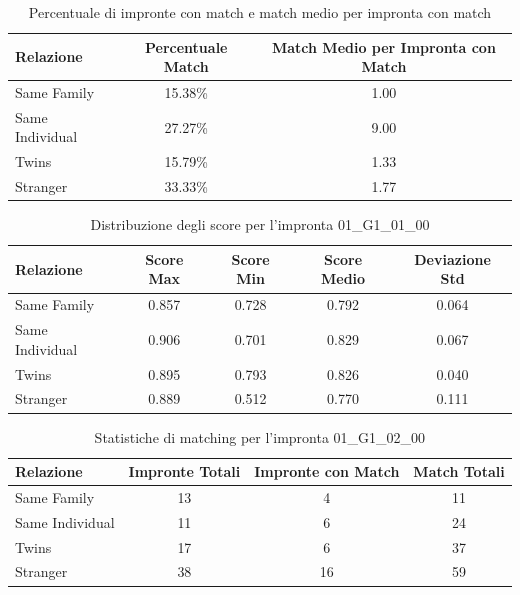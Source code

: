 \begin{table}[htbp]
\centering
\caption{Percentuale di impronte con match e match medio per impronta con match}
\label{tab:match_percentage_01_G1_01_00}
\begin{tabular}{|l|c|c|}
\hline
\textbf{Relazione} & \textbf{Percentuale Match} & \textbf{Match Medio per Impronta con Match} \\
\hline
Same Family & 15.38\% & 1.00 \\
\hline
Same Individual & 27.27\% & 9.00 \\
\hline
Twins & 15.79\% & 1.33 \\
\hline
Stranger & 33.33\% & 1.77 \\
\hline
\end{tabular}
\end{table}


\begin{table}[htbp]
\centering
\caption{Distribuzione degli score per l'impronta 01\_G1\_01\_00}
\label{tab:scores_01_G1_01_00}
\begin{tabular}{|l|c|c|c|c|}
\hline
\textbf{Relazione} & \textbf{Score Max} & \textbf{Score Min} & \textbf{Score Medio} & \textbf{Deviazione Std} \\
\hline
Same Family & 0.857 & 0.728 & 0.792 & 0.064 \\
\hline
Same Individual & 0.906 & 0.701 & 0.829 & 0.067 \\
\hline
Twins & 0.895 & 0.793 & 0.826 & 0.040 \\
\hline
Stranger & 0.889 & 0.512 & 0.770 & 0.111 \\
\hline
\end{tabular}
\end{table}


\begin{table}[htbp]
\centering
\caption{Statistiche di matching per l'impronta 01\_G1\_02\_00}
\label{tab:results_01_G1_02_00}
\begin{tabular}{|l|c|c|c|}
\hline
\textbf{Relazione} & \textbf{Impronte Totali} & \textbf{Impronte con Match} & \textbf{Match Totali} \\
\hline
Same Family & 13 & 4 & 11 \\
\hline
Same Individual & 11 & 6 & 24 \\
\hline
Twins & 17 & 6 & 37 \\
\hline
Stranger & 38 & 16 & 59 \\
\hline
\end{tabular}
\end{table}


